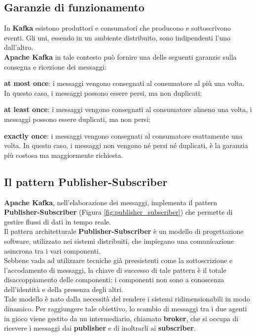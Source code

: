 \subsection{Garanzie di funzionamento}
In \textbf{Kafka} esistono produttori e consumatori che producono e sottoscrivono eventi. Gli uni, essendo in un ambiente distribuito,
sono indipendenti l’uno dall’altro. \\
\textbf{Apache Kafka} in tale contesto può fornire una delle seguenti garanzie sulla consegna e ricezione dei messaggi:
\begin{list}{*}
    \item \textbf{at most once}: i messaggi vengono consegnati al consumatore al più una volta. In questo caso, i messaggi possono essere persi, ma non duplicati;
   \item \item  \textbf{at least once}: i messaggi vengono consegnati al consumatore almeno una volta, i messaggi possono essere duplicati, ma non persi;
    \item \textbf{exactly once}: i messaggi vengono consegnati al consumatore esattamente una volta. In questo caso, i messaggi non vengono né persi né duplicati, è la garanzia più costosa ma maggiormente richiesta.
\end{list}
\subsection{Il pattern Publisher-Subscriber}
\textbf{Apache Kafka}, nell'elaborazione dei messaggi, implementa il pattern \textbf{Publisher-Subscriber} (Figura \ref{fig:publisher_subscriber}) che permette di gestire flussi di dati in tempo reale.\\
Il pattern architetturale \textbf{Publisher-Subscriber} è un modello di progettazione software, utilizzato nei sistemi distribuiti, che impiegano una comunicazione asincrona tra i vari componenti.\\
Sebbene vada ad utilizzare tecniche già preesistenti come la sottoscrizione e l'accodamento di messaggi, la  chiave di successo di tale pattern è il totale disaccoppiamento delle componenti: i componenti non sono a conoscenza dell'identità e della presenza degli altri.\\
Tale modello è nato dalla necessità del rendere i sistemi ridimensionabili in modo dinamico. Per raggiungere tale obiettivo, lo scambio di messaggi 
tra i due agenti in gioco viene gestito da un intermediario, chiamato \textbf{broker}, che si occupa di ricevere i messaggi dai \textbf{publisher} e di inoltrarli ai \textbf{subscriber}.\\
